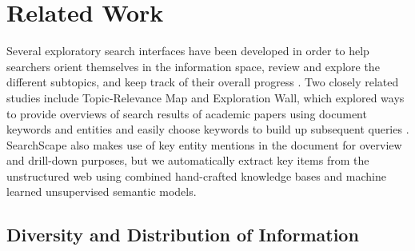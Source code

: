 \section{Related Work}


Several exploratory search interfaces have been developed in order to help searchers orient themselves in the information space, review and explore the different subtopics, and keep track of their overall progress \cite{hearst2009search,marchionini2000agileviews,patterson2001predicting,tretter2013searchpanel,morris2008searchbar}. Two closely related studies include Topic-Relevance Map and Exploration Wall, which explored ways to provide overviews of search results of academic papers using document keywords and entities and easily choose keywords to build up subsequent queries \cite{peltonen2017topic,klouche2015designing}. SearchScape also makes use of key entity mentions in the document for overview and drill-down purposes, but we automatically extract key items from the unstructured web using combined hand-crafted knowledge bases and machine learned unsupervised semantic models.





\subsection{Diversity and Distribution of Information}


